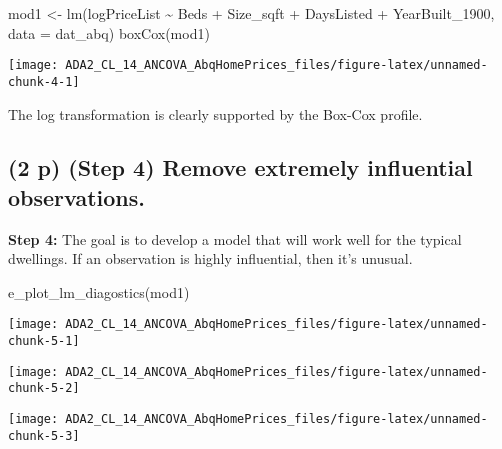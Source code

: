 \documentclass[
  12pt,
]{article}
\newenvironment{Shaded}{\begin{snugshade}}{\end{snugshade}}
\newcommand{\AttributeTok}[1]{\textcolor[rgb]{0.77,0.63,0.00}{#1}}
\newcommand{\FunctionTok}[1]{\textcolor[rgb]{0.00,0.00,0.00}{#1}}
\newcommand{\NormalTok}[1]{#1}
\newcommand{\OtherTok}[1]{\textcolor[rgb]{0.56,0.35,0.01}{#1}}
\newcommand{\SpecialCharTok}[1]{\textcolor[rgb]{0.00,0.00,0.00}{#1}}
\begin{document}
\begin{Shaded}
\begin{Highlighting}[]
\NormalTok{mod1 }\OtherTok{\textless{}{-}} \FunctionTok{lm}\NormalTok{(logPriceList }\SpecialCharTok{\textasciitilde{}}\NormalTok{ Beds }\SpecialCharTok{+}\NormalTok{ Size\_sqft }\SpecialCharTok{+}\NormalTok{ DaysListed }\SpecialCharTok{+}\NormalTok{ YearBuilt\_1900, }
           \AttributeTok{data =}\NormalTok{ dat\_abq)}
\FunctionTok{boxCox}\NormalTok{(mod1)}
\end{Highlighting}
\end{Shaded}

\begin{center}\texttt{[image: ADA2\_CL\_14\_ANCOVA\_AbqHomePrices\_files/figure-latex/unnamed-chunk-4-1]} \end{center}

The log transformation is clearly supported by the Box-Cox profile.

\hypertarget{p-step-4-remove-extremely-influential-observations.}{%
\subsection{\texorpdfstring{\textbf{(2 p)} (Step 4) Remove extremely
influential
observations.}{(2 p) (Step 4) Remove extremely influential observations.}}\label{p-step-4-remove-extremely-influential-observations.}}

\textbf{Step 4:} The goal is to develop a model that will work well for
the typical dwellings. If an observation is highly influential, then
it's unusual.

\begin{Shaded}
\begin{Highlighting}[]
\FunctionTok{e\_plot\_lm\_diagostics}\NormalTok{(mod1)}
\end{Highlighting}
\end{Shaded}

\begin{center}\texttt{[image: ADA2\_CL\_14\_ANCOVA\_AbqHomePrices\_files/figure-latex/unnamed-chunk-5-1]} \end{center}

\begin{center}\texttt{[image: ADA2\_CL\_14\_ANCOVA\_AbqHomePrices\_files/figure-latex/unnamed-chunk-5-2]} \end{center}

\begin{center}\texttt{[image: ADA2\_CL\_14\_ANCOVA\_AbqHomePrices\_files/figure-latex/unnamed-chunk-5-3]} \end{center}
\end{document}
